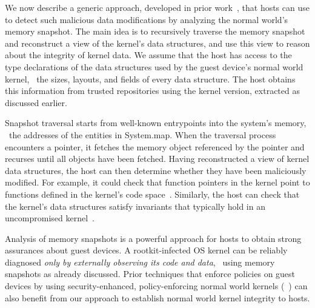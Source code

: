 We now describe a generic approach, developed in prior
work~\cite{sbcfi:ccs07,gib:tdsc11,kop:ccs09,kop:sec12,osck:asplos11}, that
hosts can use to detect such malicious data modifications by analyzing the
normal world's memory snapshot. The main idea is to recursively traverse the
memory snapshot and reconstruct a view of the kernel's data structures, and use
this view to reason about the integrity of kernel data. We assume that the host
has access to the type declarations of the data structures used by the guest
device's normal world kernel, \eg~the sizes, layouts, and fields of every data
structure. The host obtains this information from trusted repositories using
the kernel version, extracted as discussed earlier.

Snapshot traversal starts from well-known entrypoints into the system's memory,
\eg~the addresses of the entities in \textsf{System.map}. When the traversal
process encounters a pointer, it fetches the memory object referenced by the
pointer and recurses until all objects have been fetched.  
Having reconstructed a view of kernel data structures, the host can then
determine whether they have been maliciously modified. For example, it could
check that function pointers in the kernel point to functions defined in the
kernel's code space~\cite{sbcfi:ccs07}. Similarly, the host can check that the
kernel's data structures satisfy invariants that typically hold in an
uncompromised kernel~\cite{gib:tdsc11}.  

Analysis of memory snapshots is a powerful approach for hosts to obtain strong
assurances about guest devices. A rootkit-infected OS kernel can be reliably
diagnosed \textit{only by externally observing its code and data}, \eg~using
memory snapshots as already discussed. Prior techniques that enforce policies
on guest devices by using security-enhanced, policy-enforcing normal world
kernels
(\eg~\cite{asm:sec14,flaskdroid:sec13,conxsense:asiaccs14,worlddriven:ccs14,blindspot:2009,markit:upside14,knox:mdm,ms:intune,blackberry:emm})
can also benefit from our approach to establish normal world kernel integrity
to hosts. 

